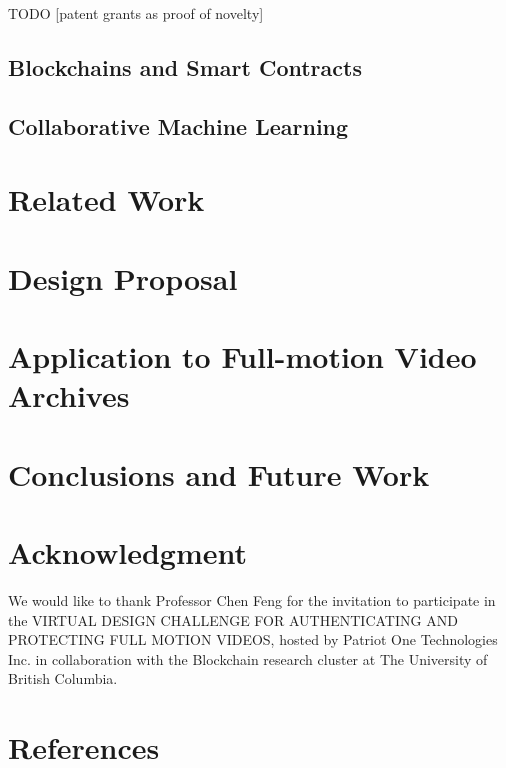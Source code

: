 \documentclass[conference]{IEEEtran}
\begin{document}
TODO [patent grants as proof of novelty]

\subsection{Blockchains and Smart Contracts}
\subsection{Collaborative Machine Learning}

\section{Related Work}
\section{Design Proposal}
\section{Application to Full-motion Video Archives}
\section{Conclusions and Future Work}
\section*{Acknowledgment}
We would like to thank Professor Chen Feng for the invitation to participate in the VIRTUAL DESIGN CHALLENGE FOR AUTHENTICATING  AND  PROTECTING  FULL  MOTION  VIDEOS, hosted by Patriot One Technologies Inc. in collaboration with the Blockchain research cluster at The University of British Columbia.
\section*{References}
\end{document}
